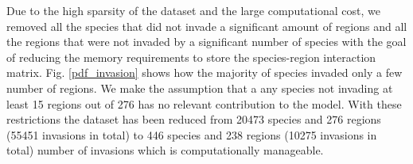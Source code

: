 \documentclass[mscthesis]{usiinfthesis}
\begin{document}


Due to the high sparsity of the dataset and the large computational cost, we removed all the species that did not invade a significant amount of regions and all the regions that were not invaded by a significant number of species with the goal of reducing the memory requirements to store the species-region interaction matrix. Fig. \ref{pdf_invasion} shows how the majority of species invaded only a few number of regions. We make the assumption that a any species not invading at least 15 regions out of 276 has no relevant contribution to the model. With these restrictions the dataset has been reduced from 20473 species and 276 regions (55451 invasions in total) to 446 species and 238 regions (10275 invasions in total) number of invasions which is computationally manageable. 
\end{document}

